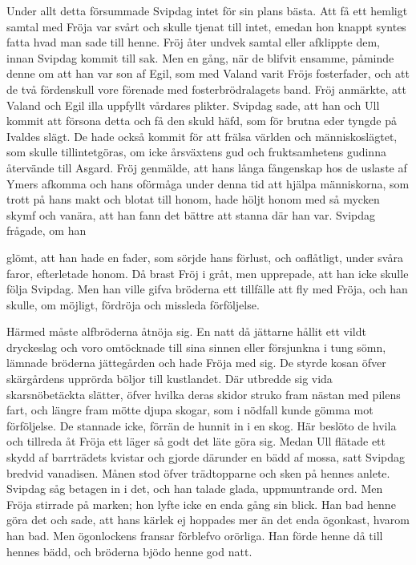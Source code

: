Under allt detta försummade Svipdag intet för sin plans bästa. Att få
ett hemligt samtal med Fröja var svårt och skulle tjenat till intet,
emedan hon knappt syntes fatta hvad man sade till henne. Fröj åter
undvek samtal eller afklippte dem, innan Svipdag kommit till sak. Men en
gång, när de blifvit ensamme, påminde denne om att han var son af Egil,
som med Valand varit Fröjs fosterfader, och att de två fördenskull vore
förenade med fosterbrödralagets band. Fröj anmärkte, att Valand och Egil
illa uppfyllt vårdares plikter. Svipdag sade, att han och Ull kommit att
försona detta och få den skuld häfd, som för brutna eder tyngde på
Ivaldes slägt. De hade också kommit för att frälsa världen och
människoslägtet, som skulle tillintetgöras, om icke årsväxtens gud och
fruktsamhetens gudinna återvände till Asgard. Fröj genmälde, att hans
långa fångenskap hos de uslaste af Ymers afkomma och hans oförmåga under
denna tid att hjälpa människorna, som trott på hans makt och blotat till
honom, hade höljt honom med så mycken skymf och vanära, att han fann det
bättre att stanna där han var. Svipdag frågade, om han

glömt, att han hade en fader, som sörjde hans förlust, och oaflåtligt,
under svåra faror, efterletade honom. Då brast Fröj i gråt, men
upprepade, att han icke skulle följa Svipdag. Men han ville gifva
bröderna ett tillfälle att fly med Fröja, och han skulle, om möjligt,
fördröja och missleda förföljelse.

Härmed måste alfbröderna åtnöja sig. En natt då jättarne hållit ett
vildt dryckeslag och voro omtöcknade till sina sinnen eller försjunkna i
tung sömn, lämnade bröderna jättegården och hade Fröja med sig. De
styrde kosan öfver skärgårdens upprörda böljor till kustlandet. Där
utbredde sig vida skarsnöbetäckta slätter, öfver hvilka deras skidor
struko fram nästan med pilens fart, och längre fram mötte djupa skogar,
som i nödfall kunde gömma mot förföljelse. De stannade icke, förrän de
hunnit in i en skog. Här beslöto de hvila och tillreda åt Fröja ett
läger så godt det läte göra sig. Medan Ull flätade ett skydd af
barrträdets kvistar och gjorde därunder en bädd af mossa, satt Svipdag
bredvid vanadisen. Månen stod öfver trädtopparne och sken på hennes
anlete. Svipdag såg betagen in i det, och han talade glada, uppmuntrande
ord. Men Fröja stirrade på marken; hon lyfte icke en enda gång sin
blick. Han bad henne göra det och sade, att hans kärlek ej hoppades mer
än det enda ögonkast, hvarom han bad. Men ögonlockens fransar förblefvo
orörliga. Han förde henne då till hennes bädd, och bröderna bjödo henne
god natt.

